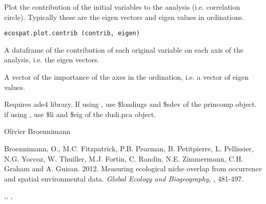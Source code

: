 \documentclass[a4paper]{book}
\begin{document}
%
\begin{Description}\relax
Plot the contribution of the initial variables to the analysis (i.e. correlation circle). Typically these are the eigen vectors and eigen values in ordinations.
\end{Description}
%
\begin{Usage}
\begin{verbatim}
ecospat.plot.contrib (contrib, eigen)
\end{verbatim}
\end{Usage}
%
\begin{Arguments}
\begin{ldescription}
\item[\code{contrib}] A dataframe of the contribution of each original variable on each axis of the analysis, i.e. the eigen vectors. 
\item[\code{eigen}] A vector of the importance of the axes in the ordination, i.e. a vector of eigen values.
\end{ldescription}
\end{Arguments}
%
\begin{Details}\relax
Requires ade4 library. If using  , use \$loadings and \$sdev of the princomp object. if using , use \$li and \$eig of the dudi.pca object.
\end{Details}
%
\begin{Author}\relax
Olivier Broennimann 
\end{Author}
%
\begin{References}\relax
Broennimann, O., M.C. Fitzpatrick, P.B. Pearman, B. Petitpierre, L. Pellissier, N.G. Yoccoz, W. Thuiller, M.J. Fortin, C. Randin, N.E. Zimmermann, C.H. Graham and A. Guisan. 2012. Measuring ecological niche overlap from occurrence and spatial environmental data. \emph{Global Ecology and Biogeography}, , 481-497.
\end{References}
%
\begin{SeeAlso}\relax
{},,
,
\end{SeeAlso}
\end{document}
